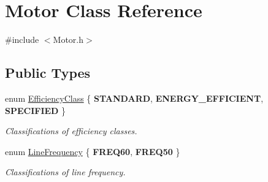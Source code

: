 \hypertarget{class_motor}{}\section{Motor Class Reference}
\label{class_motor}


{\ttfamily \#include $<$Motor.\+h$>$}

\subsection*{Public Types}
\begin{DoxyCompactItemize}
\item 
\mbox{\label{class_motor_afa022971ae062406a9f588c601673d4e}} 
enum \hyperlink{class_motor_afa022971ae062406a9f588c601673d4e}{Efficiency\+Class} \{ {\bfseries S\+T\+A\+N\+D\+A\+RD}, 
{\bfseries E\+N\+E\+R\+G\+Y\+\_\+\+E\+F\+F\+I\+C\+I\+E\+NT}, 
{\bfseries S\+P\+E\+C\+I\+F\+I\+ED}
 \}\begin{DoxyCompactList}\small\item\em Classifications of efficiency classes. \end{DoxyCompactList}
\item 
\mbox{\label{class_motor_acee1bdf1b684ad36cb80dc2829d9fcee}} 
enum \hyperlink{class_motor_acee1bdf1b684ad36cb80dc2829d9fcee}{Line\+Frequency} \{ {\bfseries F\+R\+E\+Q60}, 
{\bfseries F\+R\+E\+Q50}
 \}\begin{DoxyCompactList}\small\item\em Classifications of line frequency. \end{DoxyCompactList}
\end{DoxyCompactItemize}
